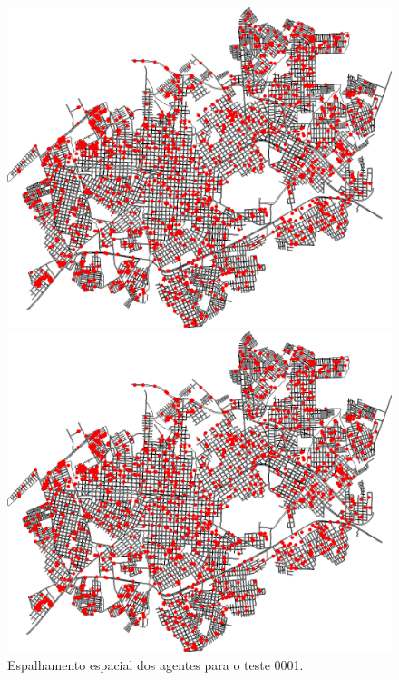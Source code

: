\begin{figure}[H]
\begin{minipage}{.5\textwidth}
    \captionsetup{labelformat=empty}
  \end{minipage}
  \begin{minipage}{.5\textwidth}
    \centering
    \includegraphics[width=1.0\textwidth]{Figuras/Resultados/0001/Saidas_GPU_BIT/MonteCarlo_0/Simulacao_0/Espacial/00160.png}
    \captionsetup{labelformat=empty}
  \end{minipage}%
  \begin{minipage}{.5\textwidth}
    \centering
    \includegraphics[width=1.0\textwidth]{Figuras/Resultados/0001/Saidas_GPU_BIT/MonteCarlo_0/Simulacao_0/Espacial/00200.png}
    \captionsetup{labelformat=empty}
  \end{minipage}
  \caption{Espalhamento espacial dos agentes para o teste 0001.}
  \label{fig:espacial_0001}
\end{figure}

